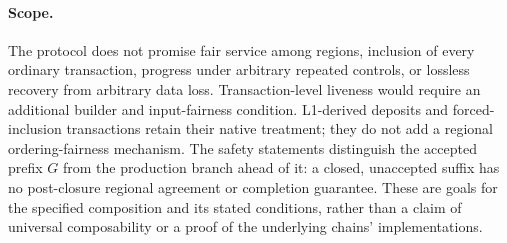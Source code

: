 \paragraph{Scope.}
The protocol does not promise fair service among regions, inclusion of
every ordinary transaction, progress under arbitrary repeated controls,
or lossless recovery from arbitrary data loss.  Transaction-level
liveness would require an additional builder and input-fairness
condition.  L1-derived deposits and forced-inclusion transactions retain
their native treatment; they do not add a regional ordering-fairness
mechanism.  The safety statements distinguish the accepted prefix $G$
from the production branch ahead of it: a closed, unaccepted suffix has
no post-closure regional agreement or completion guarantee.  These are
goals for the specified composition and its stated conditions, rather
than a claim of universal composability or a proof of the underlying
chains' implementations.
